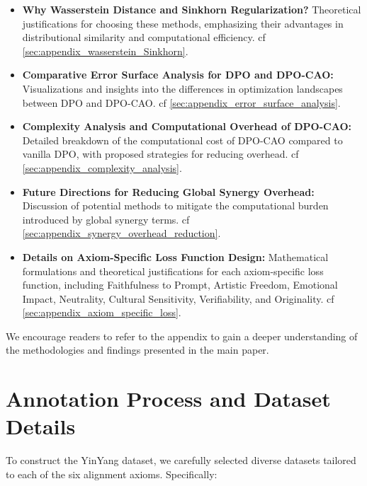 \begin{itemize}
    \item \textbf{Why Wasserstein Distance and Sinkhorn Regularization?} 
    Theoretical justifications for choosing these methods, emphasizing their advantages in distributional similarity and computational efficiency. cf \cref{sec:appendix_wasserstein_Sinkhorn}.

    \item \textbf{Comparative Error Surface Analysis for DPO and DPO-CAO:} 
    Visualizations and insights into the differences in optimization landscapes between DPO and DPO-CAO. cf \cref{sec:appendix_error_surface_analysis}.

    \item \textbf{Complexity Analysis and Computational Overhead of DPO-CAO:} 
    Detailed breakdown of the computational cost of DPO-CAO compared to vanilla DPO, with proposed strategies for reducing overhead. cf \cref{sec:appendix_complexity_analysis}.

    \item \textbf{Future Directions for Reducing Global Synergy Overhead:} 
    Discussion of potential methods to mitigate the computational burden introduced by global synergy terms. cf \cref{sec:appendix_synergy_overhead_reduction}.

    \item \textbf{Details on Axiom-Specific Loss Function Design:} 
    Mathematical formulations and theoretical justifications for each axiom-specific loss function, including Faithfulness to Prompt, Artistic Freedom, Emotional Impact, Neutrality, Cultural Sensitivity, Verifiability, and Originality. cf \cref{sec:appendix_axiom_specific_loss}.
\end{itemize}

We encourage readers to refer to the appendix to gain a deeper understanding of the methodologies and findings presented in the main paper.

\section{Annotation Process and Dataset Details}
\label{sec:appendix:dataset}

To construct the YinYang dataset, we carefully selected diverse datasets tailored to each of the six alignment axioms. Specifically:

